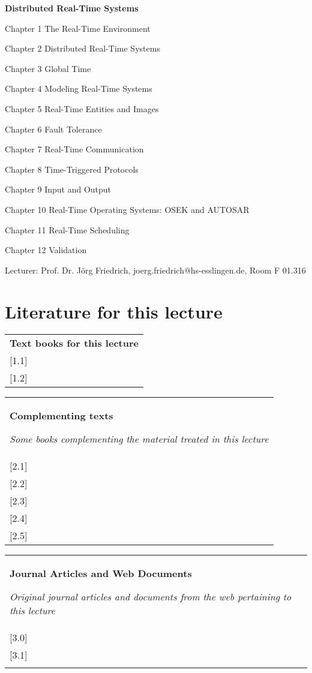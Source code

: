 

\textbf{Distributed Real-Time Systems}

Chapter 1 The Real-Time Environment

Chapter 2 Distributed Real-Time Systems

Chapter 3 Global Time

Chapter 4 Modeling Real-Time Systems

Chapter 5 Real-Time Entities and Images

Chapter 6 Fault Tolerance

Chapter 7 Real-Time Communication

Chapter 8 Time-Triggered Protocols

Chapter 9 Input and Output

Chapter 10 Real-Time Operating Systems: OSEK and AUTOSAR

Chapter 11 Real-Time Scheduling

Chapter 12 Validation

Lecturer: Prof. Dr. Jörg Friedrich, joerg.friedrich@hs-esslingen.de,
Room F 01.316

\section{Literature for this lecture}\label{literature-for-this-lecture}

\begin{longtable}[c]{@{}l@{}}
\toprule
\textbf{Text books for this lecture}\tabularnewline
{[}1.1{]}\tabularnewline
{[}1.2{]}\tabularnewline
\bottomrule
\end{longtable}

\begin{longtable}[c]{@{}l@{}}
\toprule
\textbf{Complementing texts}

\emph{Some books complementing the material treated in this
lecture}\tabularnewline
{[}2.1{]}\tabularnewline
{[}2.2{]}\tabularnewline
{[}2.3{]}\tabularnewline
{[}2.4{]}\tabularnewline
{[}2.5{]}\tabularnewline
\bottomrule
\end{longtable}

\begin{longtable}[c]{@{}l@{}}
\toprule
\textbf{Journal Articles and Web Documents}

\emph{Original journal articles and documents from the web pertaining to
this lecture}\tabularnewline
{[}3.0{]}\tabularnewline
{[}3.1{]}\tabularnewline
\tabularnewline
\bottomrule
\end{longtable}


